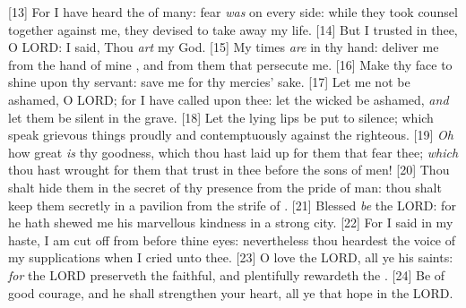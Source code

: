 [13] \textcolor[cmyk]{0.99998,1,0,0}{For I have heard the  of many: fear \emph{was} on every side: while they took counsel together against me, they devised to take away my life.}
[14] \textcolor[cmyk]{0.99998,1,0,0}{But I trusted in thee, O LORD: I said, Thou \emph{art} my God.}
[15] \textcolor[cmyk]{0.99998,1,0,0}{My times \emph{are} in thy hand: deliver me from the hand of mine , and from them that persecute me.}
[16] \textcolor[cmyk]{0.99998,1,0,0}{Make thy face to shine upon thy servant: save me for thy mercies' sake.}
[17] \textcolor[cmyk]{0.99998,1,0,0}{Let me not be ashamed, O LORD; for I have called upon thee: let the wicked be ashamed, \emph{and} let them be silent in the grave.}
[18] \textcolor[cmyk]{0.99998,1,0,0}{Let the lying lips be put to silence; which speak grievous things proudly and contemptuously against the righteous.}
[19] \textcolor[cmyk]{0.99998,1,0,0}{\emph{Oh} how great \emph{is} thy goodness, which thou hast laid up for them that fear thee; \emph{which} thou hast wrought for them that trust in thee before the sons of men!}
[20] \textcolor[cmyk]{0.99998,1,0,0}{Thou shalt hide them in the secret of thy presence from the pride of man: thou shalt keep them secretly in a pavilion from the strife of .}
[21] \textcolor[cmyk]{0.99998,1,0,0}{Blessed \emph{be} the LORD: for he hath shewed me his marvellous kindness in a strong city.}
[22] \textcolor[cmyk]{0.99998,1,0,0}{For I said in my haste, I am cut off from before thine eyes: nevertheless thou heardest the voice of my supplications when I cried unto thee.}
[23] \textcolor[cmyk]{0.99998,1,0,0}{O love the LORD, all ye his saints: \emph{for} the LORD preserveth the faithful, and plentifully rewardeth the .}
[24] \textcolor[cmyk]{0.99998,1,0,0}{Be of good courage, and he shall strengthen your heart, all ye that hope in the LORD.}